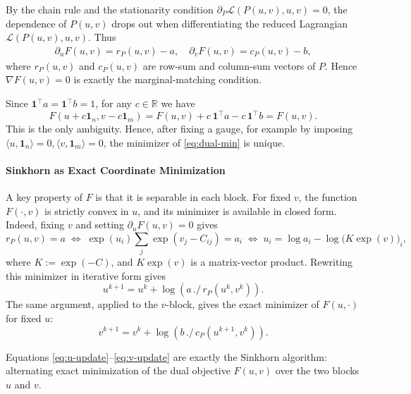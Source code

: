 \documentclass{article}
\theoremstyle{plain}
\theoremstyle{remark}
\begin{document}
By the chain rule and the stationarity condition $\partial_P\mathcal{L}(P(u,v),u,v)=0$, the dependence of $P(u,v)$ drops out when differentiating the reduced Lagrangian $\mathcal L(P(u,v),u,v)$. Thus
\begin{equation}\label{eq:grad-F}
\begin{aligned}
\partial_u F(u,v)=r_P(u,v)-a, \quad
\partial_v F(u,v)=c_P(u,v)-b,
\end{aligned}
\end{equation}
where $r_P(u,v)$ and $c_P(u,v)$ are row-sum and column-sum vectors of $P$. Hence $\nabla F(u,v)=0$ is exactly the marginal-matching condition.

Since $\mathbf{1}^\top a=\mathbf{1}^\top b=1$, for any $c\in\mathbb{R}$ we have
\begin{equation}\label{eq:Fc}
F(u+c\mathbf{1}_n,v-c\mathbf{1}_m)=F(u,v)+c\,\mathbf{1}^\top a-c\,\mathbf{1}^\top b=F(u,v).
\end{equation}
This is the only ambiguity. Hence, after fixing a gauge, for example by imposing $\langle u,\mathbf{1}_n\rangle=0, \langle v,\mathbf{1}_m\rangle=0$, the minimizer of \eqref{eq:dual-min} is unique.

\paragraph{Sinkhorn as Exact Coordinate Minimization}

A key property of $F$ is that it is separable in each block. For fixed $v$, the function $F(\cdot,v)$ is strictly convex in $u$, and its minimizer is available in closed form. Indeed, fixing $v$ and setting $\partial_u F(u,v)=0$ gives
$$
r_P(u,v)=a
\;\iff\;
\exp(u_i)\sum_j \exp(v_j-C_{ij})=a_i
\;\iff\;
u_i=\log a_i-\log\!\bigl(K\exp(v)\bigr)_i,
$$
where $K:=\exp(-C)$, and $K\exp(v)$ is a matrix-vector product. Rewriting this minimizer in iterative form gives
\begin{equation}\label{eq:u-update}
u^{k+1}=u^k+\log(a\,./\,r_P(u^k,v^k)).
\end{equation}
The same argument, applied to the $v$-block, gives the exact minimizer of $F(u,\cdot)$ for fixed $u$:
\begin{equation}\label{eq:v-update}
v^{k+1}=v^k+\log(b\,./\,c_P(u^{k+1},v^k)).
\end{equation}

Equations \eqref{eq:u-update}--\eqref{eq:v-update} are exactly the Sinkhorn algorithm: alternating exact minimization of the dual objective $F(u,v)$ over the two blocks $u$ and $v$.
\end{document}
